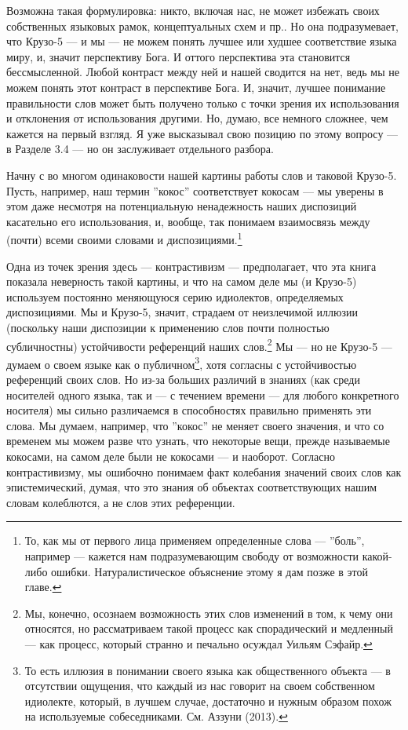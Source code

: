 \documentclass[11pt]{book}
\begin{document}
Возможна такая формулировка: никто, включая нас, не может избежать своих собственных языковых рамок, концептуальных схем и пр.. Но она подразумевает, что Крузо-5 --- и мы --- не можем понять лучшее или худшее соответствие языка миру, и, значит перспективу Бога. И оттого перспектива эта становится бессмысленной. Любой контраст между ней и нашей сводится на нет, ведь мы не можем понять этот контраст в перспективе Бога. И, значит, лучшее понимание правильности слов может быть получено только с точки зрения их использования и отклонения от использования другими. Но, думаю, все немного сложнее, чем кажется на первый взгляд. Я уже высказывал свою позицию по этому вопросу --- в Разделе 3.4 --- но он заслуживает отдельного разбора.

Начну с во многом одинаковости нашей картины работы слов и таковой Крузо-5. Пусть, например, наш термин ''кокос'' соответствует кокосам --- мы уверены в этом даже несмотря на потенциальную ненадежность наших диспозиций касательно его использования, и, вообще, так понимаем взаимосвязь между (почти) всеми своими словами и диспозициями.\footnote{То, как мы от первого лица применяем определенные слова --- ''боль'', например --- кажется нам подразумевающим свободу от возможности какой-либо ошибки. Натуралистическое объяснение этому я дам позже в этой главе.}

Одна из точек зрения здесь --- контрастивизм --- предполагает, что эта книга показала неверность такой картины, и что на самом деле мы (и Крузо-5) используем постоянно меняющуюся серию идиолектов, определяемых диспозициями. Мы и Крузо-5, значит, страдаем от неизлечимой иллюзии (поскольку наши диспозиции к применению слов почти полностью субличностны) устойчивости референций наших слов.\footnote{Мы, конечно, осознаем возможность этих слов изменений в том, к чему они относятся, но рассматриваем такой процесс как спорадический и медленный --- как процесс, который странно и печально осуждал Уильям Сэфайр.} Мы --- но не Крузо-5 --- думаем о своем языке как о публичном\footnote{То есть иллюзия в понимании своего языка как общественного объекта --- в отсутствии ощущения, что каждый из нас говорит на своем собственном идиолекте, который, в лучшем случае, достаточно и нужным образом похож на используемые собеседниками. См. Аззуни (2013).}, хотя согласны с устойчивостью референций своих слов. Но из-за больших различий в знаниях (как среди носителей одного языка, так и --- с течением времени --- для любого конкретного носителя) мы сильно различаемся в способностях правильно применять эти слова. Мы думаем, например, что ''кокос'' не меняет своего значения, и что со временем мы можем разве что узнать, что некоторые вещи, прежде называемые кокосами, на самом деле были не кокосами --- и наоборот. Согласно контрастивизму, мы ошибочно понимаем факт колебания значений своих слов как эпистемический, думая, что это знания об объектах соответствующих нашим словам колеблются, а не слов этих референции.
\end{document}
